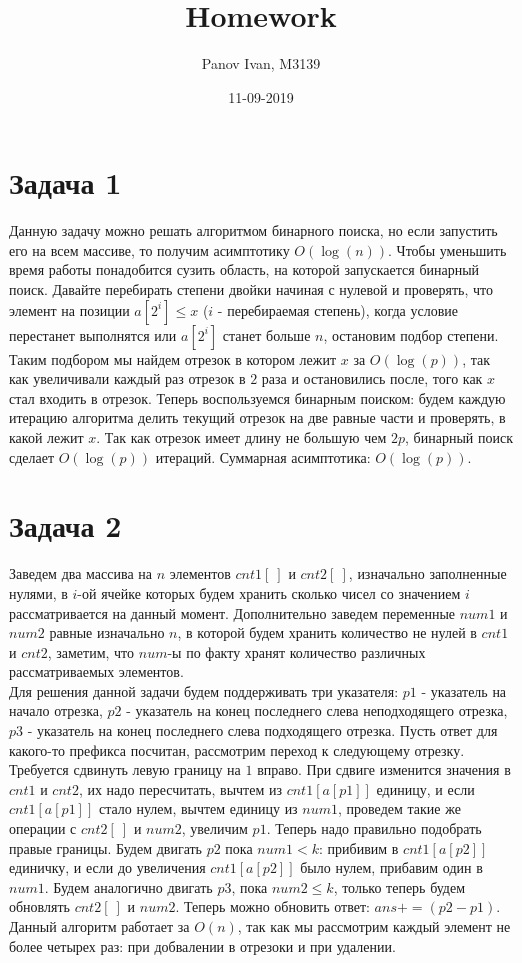 \documentclass{article}
\title{Homework}
\date{11-09-2019}
\author{Panov Ivan, M3139}
\begin{document}
	
	\maketitle
	\newpage
	
	\section*{Задача 1}
	Данную задачу можно решать алгоритмом бинарного поиска, но если запустить его на всем массиве, то получим асимптотику $O(\log(n))$. Чтобы уменьшить время работы понадобится сузить область, на которой запускается бинарный поиск. Давайте перебирать степени двойки начиная с нулевой и проверять, что элемент на позиции $a[2^i] \le x$ ($i$ - перебираемая степень), когда условие перестанет выполнятся или $a[2^i]$ станет больше $n$, остановим подбор степени. Таким подбором мы найдем отрезок в котором лежит $x$ за $O(\log(p))$, так как увеличивали каждый раз отрезок в $2$ раза и остановились после, того как $x$ стал входить в отрезок. Теперь воспользуемся бинарным поиском: будем каждую итерацию алгоритма делить текущий отрезок на две равные части и проверять, в какой лежит $x$. Так как отрезок имеет длину не большую чем $2p$, бинарный поиск сделает $O(\log(p))$ итераций. Суммарная асимптотика: $O(\log(p))$. 
	
	\section*{Задача 2}
	Заведем два массива на $n$ элементов $cnt1[\ ]$ и $cnt2[\ ]$, изначально заполненные нулями, в $i$-ой ячейке которых будем хранить сколько чисел со значением $i$ рассматривается на данный момент. Дополнительно заведем переменные $num1$ и $num2$ равные изначально $n$, в которой будем хранить количество не нулей в $cnt1$ и $cnt2$, заметим, что $num$-ы по факту хранят количество различных рассматриваемых элементов.
	\\
	Для решения данной задачи будем поддерживать три указателя: $p1$ - указатель на начало отрезка, $p2$ - указатель на конец последнего слева неподходящего отрезка, $p3$ - указатель на конец последнего слева подходящего отрезка. Пусть ответ для какого-то префикса посчитан, рассмотрим переход к следующему отрезку. Требуется сдвинуть левую границу на $1$ вправо. При сдвиге изменится значения в $cnt1$ и $cnt2$, их надо пересчитать, вычтем из $cnt1[a[p1]]$ единицу, и если $cnt1[a[p1]]$ стало нулем, вычтем единицу из $num1$, проведем такие же операции с $cnt2[\ ]$ и $num2$, увеличим $p1$. Теперь надо правильно подобрать правые границы. Будем двигать $p2$ пока $num1 < k$: прибивим в $cnt1[a[p2]]$ единичку, и если до увеличения $cnt1[a[p2]]$ было нулем, прибавим один в $num1$. Будем аналогично двигать $p3$, пока $num2 \leq k$, только теперь будем обновлять $cnt2[\ ]$ и $num2$. Теперь можно обновить ответ: $ans += (p2 - p1)$.	
	\\
	Данный алгоритм работает за $O(n)$, так как мы рассмотрим каждый элемент не более четырех раз: при добвалении в отрезоки и при удалении.
	\\
	\\
	
\end{document}
